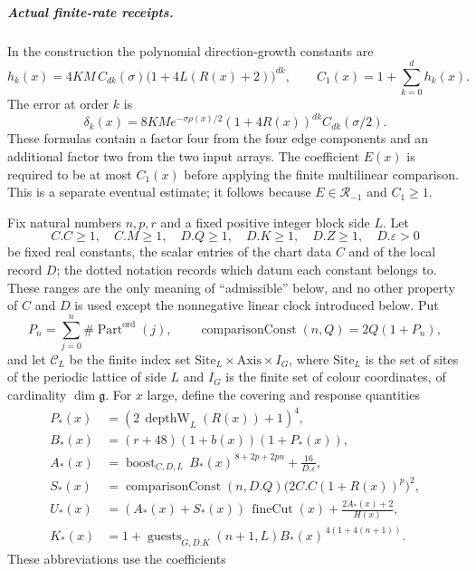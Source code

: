 \subparagraph{Actual finite-rate receipts.}
In the construction the polynomial direction-growth constants are
\[
 h_k(x)=4K M\,C_{dk}(\sigma)\bigl(1+4L(R(x)+2)\bigr)^{dk},\qquad
 C_1(x)=1+\sum_{k=0}^d h_k(x).
\]
The error at order \(k\) is
\[
 \delta_k(x)=8KM e^{-\sigma \rho(x)/2}
   (1+4R(x))^{dk}C_{dk}(\sigma/2).
\]
These formulas contain a factor four from the four edge
components and an additional factor two from the two input arrays. The
coefficient \(E(x)\) is required to be at most \(C_1(x)\) before applying
the finite multilinear comparison. This is a separate eventual estimate;
it follows because \(E\in\mathcal R_{-1}\) and \(C_1\ge1\).

\begin{proposition}
\label{prop:ex-lattice-selected-local-budget}
Fix natural numbers \(n,p,r\) and a fixed positive integer block side \(L\). Let
\[
 C.C\ge1,\quad C.M\ge1,\quad D.Q\ge1,\quad D.K\ge1,\quad D.Z\ge1,
 \quad D.\varepsilon>0
\]
be fixed real constants, the scalar entries of the chart data \(C\) and of
the local record \(D\); the dotted notation records which datum each
constant belongs to. These ranges are
the only meaning of ``admissible'' below, and no other property of \(C\)
and \(D\) is used except the nonnegative linear clock introduced below.
Put
\[
 P_n=\sum_{j=0}^{n}\#\operatorname{Part}^{\mathrm{ord}}(j),\qquad
 \operatorname{comparisonConst}(n,Q)=2Q(1+P_n),
\]
and let \(\mathcal C_L\) be the finite index set
\(\mathrm{Site}_L\times\mathrm{Axis}\times I_G\), where \(\mathrm{Site}_L\)
is the set of sites of the periodic lattice of side \(L\) and \(I_G\) is
the finite set of colour coordinates, of cardinality \(\dim\mathfrak g\).
For
\(x\) large, define the covering and response quantities
\begin{align*}
 P_*(x)&=(2\,\operatorname{depthW}_L(R(x))+1)^4,\\
 B_*(x)&=(r+48)(1+b(x))(1+P_*(x)),\\
 A_*(x)&=\operatorname{boost}_{C,D,L}\,B_*(x)^{\,8+2p+2pn}
                 +\frac{16}{D.\varepsilon},\\
 S_*(x)&=\operatorname{comparisonConst}(n,D.Q)
              \bigl(2C.C(1+R(x))^p\bigr)^2,\\
 U_*(x)&=(A_*(x)+S_*(x))\,\operatorname{fineCut}(x)
                 +\frac{2A_*(x)+2}{H(x)},\\
 K_*(x)&=1+\operatorname{guests}_{G,D.K}(n+1,L)
                      B_*(x)^{\,4(1+4(n+1))}.
\end{align*}
These abbreviations use the coefficients

\end{proposition}
